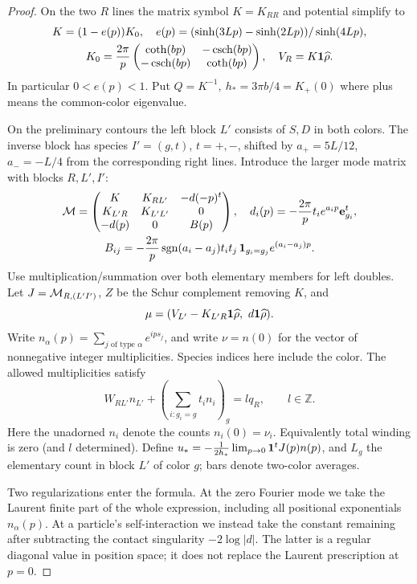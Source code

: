 \begin{proof}
On the two \(R\) lines the matrix symbol \(K=K_{RR}\) and potential simplify to
\[
 \begin{gathered}
 K=(1-e(p))K_0,\quad e(p)=(\sinh(3Lp)-\sinh(2Lp))/\sinh(4Lp),\\
 K_0=\frac{2\pi}{p}\begin{pmatrix}\coth(bp)&-\operatorname{csch}(bp)\\-\operatorname{csch}(bp)&\coth(bp)\end{pmatrix},\quad
 V_R=K{\bf1}\widehat\rho.
 \end{gathered}
\]
In particular \(0< e(p)<1\). Put \(Q=K^{-1},\ h_*=3\pi b/4=K_+(0)\) where plus means the common-color eigenvalue.

On the preliminary contours the left block \(L'\) consists of \(S,D\)
in both colors. The inverse block has species \(I'=(g,t)\),
\(t=+,-\), shifted by \(a_+=5L/12\), \(a_-=-L/4\) from the
corresponding right lines. Introduce the larger mode matrix with blocks
\(R,L',I'\):
\[
 \begin{gathered}
 {\cal M}=\begin{pmatrix}K&K_{RL'}&-d(-p)^t\\
 K_{L'R}&K_{L'L'}&0\\
 -d(p)&0&B(p)\end{pmatrix},\quad
 d_{i}(p)= -\frac{2\pi}{p} t_i e^{a_i p}{\bf e}_{g_i}^t,\\
 B_{ij}=-\frac{2\pi}{p}\operatorname{sgn}(a_i-a_j)t_i t_j\,{\bf1}_{g_i=g_j}e^{(a_i-a_j)p}.
 \end{gathered}
\]
Use multiplication/summation over both elementary members for left doubles. Let \(J={\cal M}_{R,(L'I')}\), \(Z\) be the Schur complement removing \(K\), and 
\[
 \mu=(V_{L'}-K_{L'R}{\bf1}\widehat\rho,\ d{\bf1}\widehat\rho).
\]
Write \(n_\alpha(p)=\sum_{j\text{ of type }\alpha}e^{ip s_j}\),
and write \(\nu=n(0)\) for the vector of nonnegative integer
multiplicities. Species indices here include the color. The allowed
multiplicities satisfy
\begin{equation}\label{eq:gas-preliminary-winding}
 W_{RL'}n_{L'}+\left(\sum_{i:g_i=g}t_i n_i\right)_g=l q_R,\qquad l\in{\mathbb Z}.
\end{equation}
Here the unadorned \(n_i\) denote the counts \(n_i(0)=\nu_i\).
Equivalently total winding is zero (and \(l\) determined). Define
\(u_*=-\frac1{2h_*}\lim_{p\to0}{\bf1}^t J(p)n(p)\),
and \(L_g\) the elementary count in block \(L'\) of color \(g\); bars denote two-color averages.

Two regularizations enter the formula. At the zero Fourier mode we take
the Laurent finite part of the whole expression, including all positional
exponentials \(n_\alpha(p)\). At a particle's self-interaction we instead
take the constant remaining after subtracting the contact singularity
\(-2\log|d|\). The latter is a regular diagonal value in position space;
it does not replace the Laurent prescription at \(p=0\).


\end{proof}
